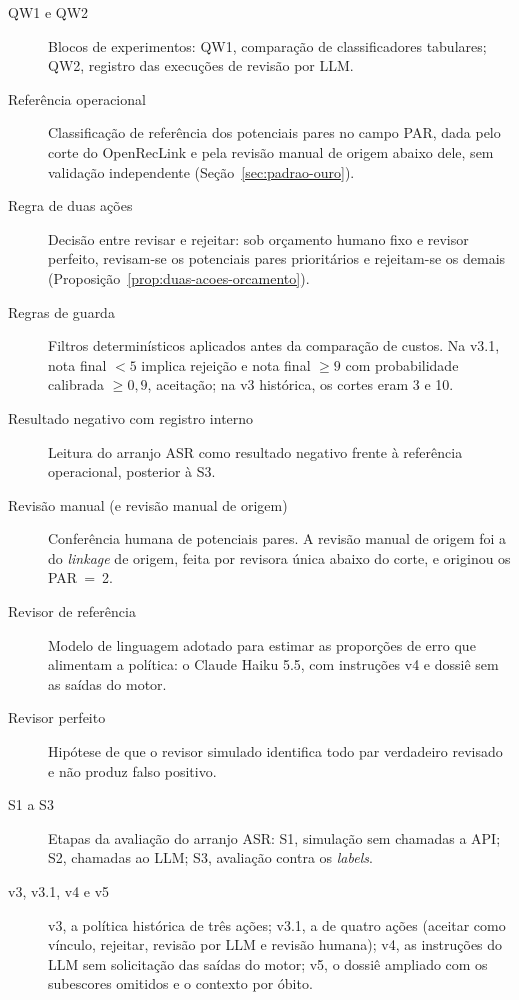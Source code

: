 \begin{description}
\item[QW1 e QW2] Blocos de experimentos: QW1, comparação de classificadores tabulares; QW2, registro das execuções de revisão por LLM.

\item[Referência operacional] Classificação de referência dos potenciais pares no campo PAR, dada pelo corte do OpenRecLink e pela revisão manual de origem abaixo dele, sem validação independente (Seção~\ref{sec:padrao-ouro}).

\item[Regra de duas ações] Decisão entre revisar e rejeitar: sob orçamento humano fixo e revisor perfeito, revisam-se os potenciais pares prioritários e rejeitam-se os demais (Proposição~\ref{prop:duas-acoes-orcamento}).

\item[Regras de guarda] Filtros determinísticos aplicados antes da comparação de custos. Na v3.1, nota final $<5$ implica rejeição e nota final $\geq9$ com probabilidade calibrada $\geq0{,}9$, aceitação; na v3 histórica, os cortes eram 3 e 10.

\item[Resultado negativo com registro interno] Leitura do arranjo ASR como resultado negativo frente à referência operacional, posterior à S3.

\item[Revisão manual (e revisão manual de origem)] Conferência humana de potenciais pares. A revisão manual de origem foi a do \textit{linkage} de origem, feita por revisora única abaixo do corte, e originou os PAR~=~2.

\item[Revisor de referência] Modelo de linguagem adotado para estimar as proporções de erro que alimentam a política: o Claude Haiku 5.5, com instruções v4 e dossiê sem as saídas do motor.

\item[Revisor perfeito] Hipótese de que o revisor simulado identifica todo par verdadeiro revisado e não produz falso positivo.

\item[S1 a S3] Etapas da avaliação do arranjo ASR: S1, simulação sem chamadas a API; S2, chamadas ao LLM; S3, avaliação contra os \textit{labels}.

\item[v3, v3.1, v4 e v5] v3, a política histórica de três ações; v3.1, a de quatro ações (aceitar como vínculo, rejeitar, revisão por LLM e revisão humana); v4, as instruções do LLM sem solicitação das saídas do motor; v5, o dossiê ampliado com os subescores omitidos e o contexto por óbito.


\end{description}
